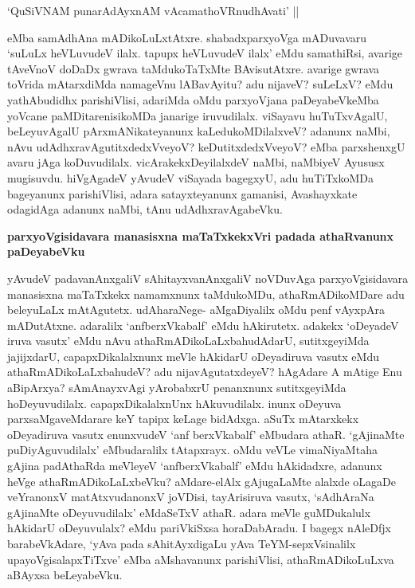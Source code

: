 \begin{shloka}
`QuSiVNAM punarAdAyxnAM vAcamathoVRnudhAvati' ||\label{216}
\end{shloka}

\noindent
eMba samAdhAna mADikoLuLxtAtxre. shabadxparxyoVga mADuvavaru `suLuLx heVLuvudeV ilalx. tapupx heVLuvudeV ilalx' eMdu samathiRsi, avarige tAveVnoV doDaDx gwrava taMdukoTaTxMte BAvisutAtxre. avarige gwrava toVrida mAtarxdiMda namageVnu lABavAyitu? adu nijaveV? suLeLxV? eMdu yathA\-budidhx parishiVlisi, adariMda oMdu parxyoVjana paDeyabeVkeMba yoVcane paMDitarenisikoMDa jana\-rige iruvudilalx. viSayavu huTuTxvAgalU, beLeyuvAgalU pArxmANikateyanunx kaLedukoMDilalxveV? adanunx naMbi, nAvu udAdhxravAgutitxdedxVveyoV? keDutitxdedxVveyoV? eMba parxshenxgU avaru jAga koDuvudilalx. vicArakekxDeyilalxdeV naMbi, naMbiyeV Ayususx mugisuvdu. hiVgAgadeV yAvudeV viSayada bagegxyU, adu huTiTxkoMDa bageyanunx parishiVlisi, adara satayxteyanunx gamanisi, Avashayxkate odagidAga adanunx naMbi, tAnu udAdhxravAgabeVku.

{\bigskip
\noindent
{\large\bf parxyoVgisidavara manasisxna maTaTxkekxVri padada athaRvanunx paDeyabeVku}}\label{page216}
\medskip

\noindent
yAvudeV padavanAnxgaliV sAhitayxvanAnxgaliV noVDuvAga parxyoVgisidavara manasisxna maTaTxkekx namamx\-nunx taMdukoMDu, athaRmADikoMDare adu beleyuLaLx mAtAgutetx. udAharaNege- aMgaDi\-yalilx oMdu penf vAyxpAra mADutAtxne. adaralilx `anfberxVkabalf' eMdu hAkirutetx. adakekx `oDeyadeV iruva vasutx' eMdu nAvu athaRmADikoLaLxbahudAdarU, sutitxgeyiMda jajijxdarU, capapxDikalalxnunx meVle hAki\-darU oDeyadiruva vasutx eMdu athaRmADikoLaLxbahudeV? adu nijavAgutatxdeyeV? hAgAdare A mAtige Enu aBipArxya? sAmAnayxvAgi yArobabxrU penanxnunx sutitxgeyiMda hoDeyuvu\-dilalx. capapx\-DikalalxnUnx hAkuvudilalx. inunx oDeyuva parxsaMgaveMdarare keY tapipx keLage bidAdxga. aSuTx mAtarxkekx oDeyadiruva vasutx enunxvudeV `anf berxVkabalf' eMbudara athaR. `gAjinaMte puDiyAguvudilalx' eMbu\-daralilx tAtapxrayx. oMdu veVLe vimaNiyaMtaha gAjina padAthaRda meVleyeV `anfberxVkabalf' eMdu hAkidadxre, adanunx heVge athaRmADikoLaLxbeVku? aMdare-elAlx gAjugaLaMte alalxde oLa\-gaDe veYranonxV matAtxvudanonxV joVDisi, tayArisiruva vasutx, `sAdhAraNa gAjinaMte oDeyuvudilalx' eMda\-SeTxV athaR. adara meVle guMDukalulx hAkidarU oDeyuvulalx? eMdu pariVkiSxsa horaDabAradu. I bagegx nAleDfjx barabeVkAdare, `yAva pada sAhitAyxdigaLu yAva TeYM-sepxVsinalilx upayoVgisalapxTiTxve' eMba aMshavanunx parishiVlisi, athaRmADikoLuLxva aBAyxsa beLeyabeVku.

